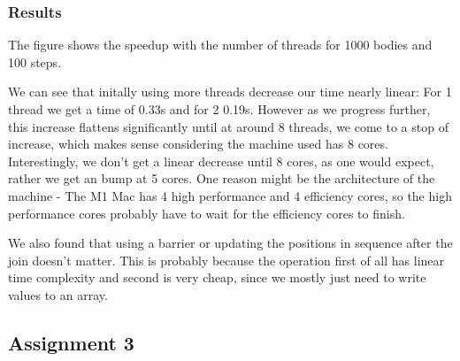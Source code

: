 \documentclass[a4paper]{scrartcl}
\begin{document}
        \subsubsection{Results}
            The figure shows the speedup with the number of threads for 1000
            bodies and 100 steps.

        We can see that initally using more threads decrease our time nearly
        linear: For 1 thread we get a time of 0.33s and for 2 0.19s. However as
        we progress further, this increase flattens significantly until at
        around 8 threads, we come to a stop of increase, which makes sense
        considering the machine used has 8 cores. Interestingly, we don't get a
        linear decrease until 8 cores, as one would expect, rather we get an
        bump at 5 cores. One reason might be the architecture of the
        machine - The M1 Mac has 4 high performance and 4 efficiency cores, so
        the high performance cores probably have to wait for the efficiency
        cores to finish.

        We also found that using a barrier or updating the positions in
        sequence after the join doesn't matter. This is probably because the
        operation first of all has linear time complexity and second is very
        cheap, since we mostly just need to write values to an array.

    \subsection{Assignment 3}
\end{document}
